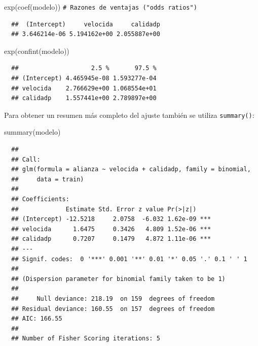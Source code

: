 \documentclass[
]{book}
\newenvironment{Shaded}{\begin{snugshade}}{\end{snugshade}}
\newcommand{\CommentTok}[1]{\textcolor[rgb]{0.56,0.35,0.01}{\textit{#1}}}
\newcommand{\FunctionTok}[1]{\textcolor[rgb]{0.00,0.00,0.00}{#1}}
\newcommand{\NormalTok}[1]{#1}
\theoremstyle{break}
\theoremstyle{nonumberplain}
\renewcommand{\CommentTok}[1]{\textcolor[rgb]{0.41,0.41,0.41}{\texttt{#1}}}
\begin{document}
\begin{Shaded}
\begin{Highlighting}[]
\FunctionTok{exp}\NormalTok{(}\FunctionTok{coef}\NormalTok{(modelo))  }\CommentTok{\# Razones de ventajas ("odds ratios")}
\end{Highlighting}
\end{Shaded}

\begin{verbatim}
  ##  (Intercept)     velocida     calidadp 
  ## 3.646214e-06 5.194162e+00 2.055887e+00
\end{verbatim}

\begin{Shaded}
\begin{Highlighting}[]
\FunctionTok{exp}\NormalTok{(}\FunctionTok{confint}\NormalTok{(modelo))}
\end{Highlighting}
\end{Shaded}

\begin{verbatim}
  ##                    2.5 %       97.5 %
  ## (Intercept) 4.465945e-08 1.593277e-04
  ## velocida    2.766629e+00 1.068554e+01
  ## calidadp    1.557441e+00 2.789897e+00
\end{verbatim}

Para obtener un resumen más completo del ajuste también se utiliza \texttt{summary()}:

\begin{Shaded}
\begin{Highlighting}[]
\FunctionTok{summary}\NormalTok{(modelo)}
\end{Highlighting}
\end{Shaded}

\begin{verbatim}
  ## 
  ## Call:
  ## glm(formula = alianza ~ velocida + calidadp, family = binomial, 
  ##     data = train)
  ## 
  ## Coefficients:
  ##             Estimate Std. Error z value Pr(>|z|)    
  ## (Intercept) -12.5218     2.0758  -6.032 1.62e-09 ***
  ## velocida      1.6475     0.3426   4.809 1.52e-06 ***
  ## calidadp      0.7207     0.1479   4.872 1.11e-06 ***
  ## ---
  ## Signif. codes:  0 '***' 0.001 '**' 0.01 '*' 0.05 '.' 0.1 ' ' 1
  ## 
  ## (Dispersion parameter for binomial family taken to be 1)
  ## 
  ##     Null deviance: 218.19  on 159  degrees of freedom
  ## Residual deviance: 160.55  on 157  degrees of freedom
  ## AIC: 166.55
  ## 
  ## Number of Fisher Scoring iterations: 5
\end{verbatim}
\end{document}
